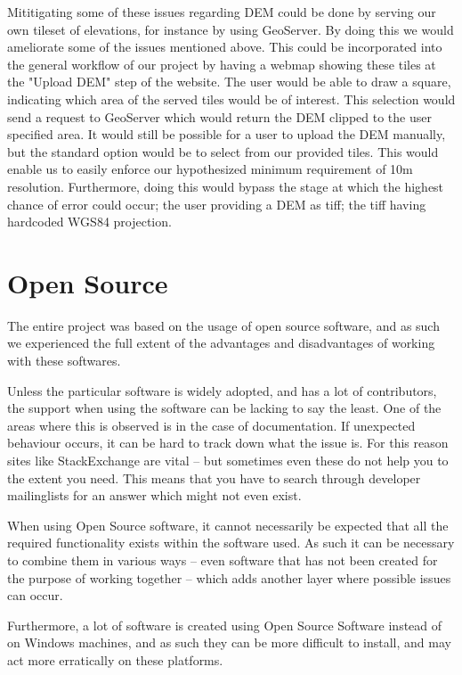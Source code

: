 Mititigating some of these issues regarding DEM could be done by serving our own tileset of elevations, for instance by using GeoServer. By doing this we would ameliorate some of the issues mentioned above. This could be incorporated into the general workflow of our project by having a webmap showing these tiles at the "Upload DEM" step of the website. The user would be able to draw a square, indicating which area of the served tiles would be of interest. This selection would send a request to GeoServer which would return the DEM clipped to the user specified area. It would still be possible for a user to upload the DEM manually, but the standard option would be to select from our provided tiles. This would enable us to easily enforce our hypothesized minimum requirement of 10m resolution. Furthermore, doing this would bypass the stage at which the highest chance of error could occur; the user providing a DEM as tiff; the tiff having hardcoded WGS84 projection.

\section{Open Source}
The entire project was based on the usage of open source software, and as such we experienced the full extent of the advantages and disadvantages of working with these softwares.

Unless the particular software is widely adopted, and has a lot of contributors, the support when using the software can be lacking to say the least. One of the areas where this is observed is in the case of documentation. If unexpected behaviour occurs, it can be hard to track down what the issue is. For this reason sites like StackExchange are vital – but sometimes even these do not help you to the extent you need. This means that you have to search through developer mailinglists for an answer which might not even exist. 

When using Open Source software, it cannot necessarily be expected that all the required functionality exists within the software used. As such it can be necessary to combine them in various ways – even software that has not been created for the purpose of working together – which adds another layer where possible issues can occur.

Furthermore, a lot of software is created using Open Source Software instead of on Windows machines, and as such they can be more difficult to install, and may act more erratically on these platforms. 

